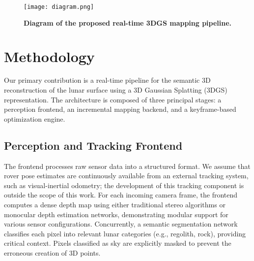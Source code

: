 \begin{figure}[t]
	\centering
	\texttt{[image: diagram.png]}
	\caption{\bfseries Diagram of the proposed real-time 3DGS mapping pipeline.}
	\label{fig:3dgs_diagram}
	\vspace{-0.5em}
\end{figure}

\vspace{-1.0em}
\section{Methodology}
\label{sec:methodology}
Our primary contribution is a real-time pipeline for the semantic 3D reconstruction of the lunar surface using a 3D Gaussian Splatting (3DGS) representation. The architecture is composed of three principal stages: a perception frontend, an incremental mapping backend, and a keyframe-based optimization engine.

\subsection{Perception and Tracking Frontend}
The frontend processes raw sensor data into a structured format. We assume that rover pose estimates are continuously available from an external tracking system, such as visual-inertial odometry; the development of this tracking component is outside the scope of this work. For each incoming camera frame, the frontend computes a dense depth map using either traditional stereo algorithms or monocular depth estimation networks, demonstrating modular support for various sensor configurations. Concurrently, a semantic segmentation network classifies each pixel into relevant lunar categories (e.g., regolith, rock), providing critical context. Pixels classified as sky are explicitly masked to prevent the erroneous creation of 3D points.

